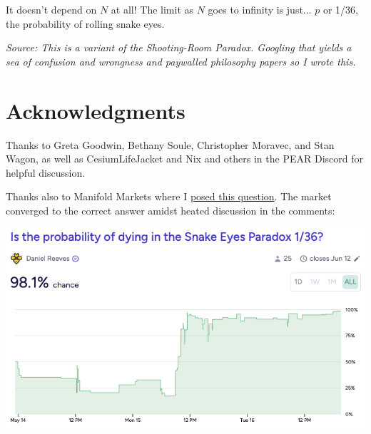 \documentclass[article,twocolumn]{memoir}
\begin{document}
It doesn't depend on $N$ at all!
The limit as $N$ goes to infinity is just... 
$p$ or 1/36, the probability of rolling snake eyes.
\qedsymbol{}

\vspace{2em}
\noindent
\emph{Source: This is a variant of the Shooting-Room Paradox.
Googling that yields a sea of confusion and wrongness and paywalled philosophy papers so I wrote this.}


\chapter*{Acknowledgments}

Thanks to 
Greta Goodwin, 
Bethany Soule, 
Christopher Moravec,
and Stan Wagon, as well as
CesiumLifeJacket and Nix and others in the PEAR Discord for helpful discussion.

Thanks also to Manifold Markets where I 
\href{https://manifold.markets/dreev/is-the-probability-of-dying-in-the}{posed this question}.
The market converged to the correct answer amidst heated discussion in the comments:

\vspace{2em}
\noindent
\includegraphics[width=\linewidth]{manifold-snakeeyes}



\end{document}
